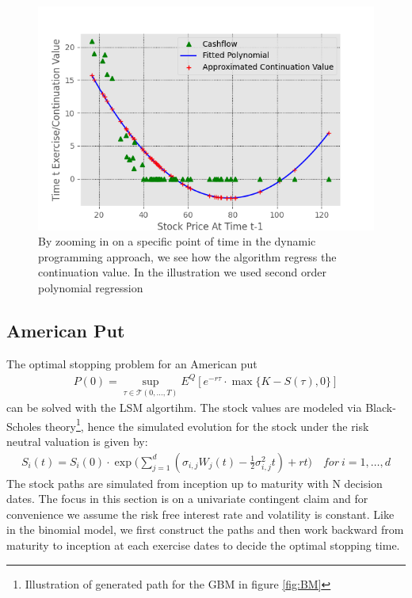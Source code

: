 \begin{figure}[th]
\centering
\includegraphics{Figures/LSMFit1.png}
\decoRule
\caption[Polynomial Regression Of Continuation Value]{By zooming in on a specific point of time in the dynamic programming approach, we see how the algorithm regress the continuation value. In the illustration we used second order polynomial regression}
\label{fig:LSM1}
\end{figure}

\subsection{American Put}
The optimal stopping problem for an American put 
\begin{equation}\label{optimalStopPut}
\begin{split}
P(0) = \sup_{\tau \in \mathcal{T}(0,\ldots,T)} E^Q[ e^{-r \tau} \cdot \max\{K-S(\tau), 0 \}]
\end{split}
\end{equation}
can be solved with the LSM algortihm. The stock values are modeled via Black-Scholes theory\footnote{Illustration of generated path for the GBM in figure \ref{fig:BM}}, hence the simulated evolution for the stock under the risk neutral valuation is given by:
\begin{equation*}
\begin{split}
S_i(t)=S_i(0) \cdot \exp \bigg( \sum_{j=1}^{d}(\sigma_{i,j} W_j(t) -\frac{1}{2} \sigma_{i,j}^2 t) + rt \bigg) \quad  for \ i=1,\ldots,d
\end{split}
\end{equation*}
The stock paths are simulated from inception up to maturity with N decision dates. The focus in this section is on a univariate contingent claim and for convenience we assume the risk free interest rate and volatility is constant. Like in the binomial model, we first construct the paths and then work backward from maturity to inception at each exercise dates to decide the optimal stopping time. \\

